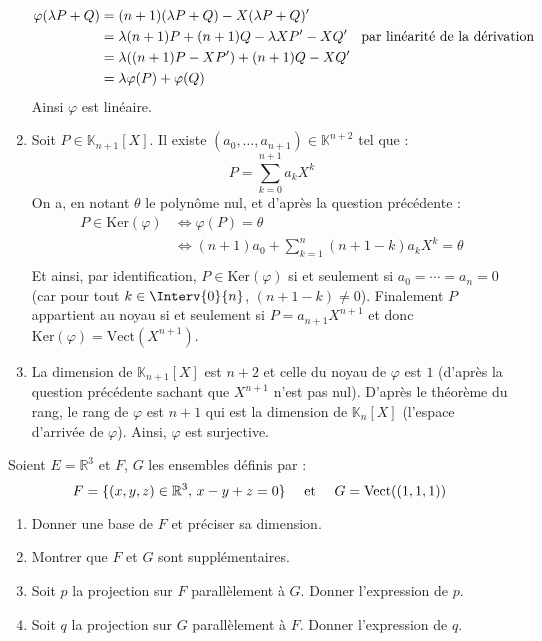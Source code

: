 \documentclass[a4paper,10pt]{report}
\begin{document}
\begin{enumerate}
\begin{align*}
\varphi(\lambda P + Q) & = (n+1)(\lambda P+Q)-X(\lambda P + Q)' \\
& = \lambda (n+1)P + (n+1)Q - \lambda X P' - XQ' \quad \hbox{par linéarité de la dérivation} \\
& = \lambda ((n+1)P-XP') + (n+1)Q-XQ' \\
& = \lambda \varphi(P) + \varphi(Q) 
\end{align*}
Ainsi $\varphi$ est linéaire.
\item Soit $P \in \mathbb{K}_{n+1}[X]$. Il existe $(a_0, \ldots, a_{n+1}) \in \mathbb{K}^{n+2}$ tel que :
$$ P = \sum_{k=0}^{n+1} a_k X^k $$
On a, en notant $\theta$ le polynôme nul, et d'après la question précédente : 
\begin{align*}
P \in \textrm{Ker}(\varphi) & \Longleftrightarrow  \varphi(P) = \theta \\
& \Longleftrightarrow (n+1) a_0 + \sum_{k=1}^n (n+1-k) a_k X^k =\theta  \\
\end{align*}
Et ainsi, par identification, $P \in \textrm{Ker}(\varphi)$ si et seulement si $a_0 = \cdots = a_n = 0$ (car pour tout $k \in \Interv{0}{n}$, $(n+1-k) \neq 0$). Finalement $P$ appartient au noyau si et seulement si $P = a_{n+1} X^{n+1}$ et donc $\textrm{Ker}(\varphi)= \textrm{Vect}(X^{n+1})$.
\item La dimension de $\mathbb{K}_{n+1}[X]$ est $n+2$ et celle du noyau de $\varphi$ est $1$ (d'après la question précédente sachant que $X^{n+1}$ n'est pas nul). D'après le théorème du rang, le rang de $\varphi$ est $n+1$ qui est la dimension de $\mathbb{K}_n[X]$ (l'espace d'arrivée de $\varphi$). Ainsi, $\varphi$ est surjective.
\end{enumerate}



\begin{Exa} Soient $E= \mathbb{R}^3$ et $F$, $G$ les ensembles définis par :
$$ F = \lbrace (x,y,z) \in \mathbb{R}^3, \, x-y+z=0 \rbrace \quad \hbox{ et }  \quad G = \textrm{Vect}((1,1,1)) $$

\begin{enumerate}
\item Donner une base de $F$ et préciser sa dimension.
\item Montrer que $F$ et $G$ sont supplémentaires.
\item Soit $p$ la projection sur $F$ parallèlement à $G$. Donner l'expression de $p$.
\item Soit $q$ la projection sur $G$ parallèlement à $F$. Donner l'expression de $q$.
\end{enumerate}
\end{Exa}
\end{document}
